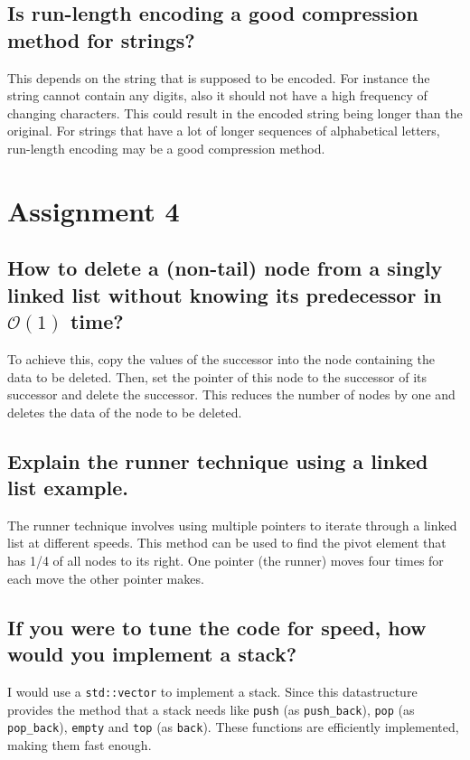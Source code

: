 \documentclass[runningheads]{llncs}
\begin{document}
\subsection*{Is run-length encoding a good compression method for strings?}
This depends on the string that is supposed to be encoded. For instance the string cannot contain any digits,
also it should not have a high frequency of changing characters. This could result in the encoded string
being longer than the original. For strings that have a lot of longer sequences of alphabetical letters,
run-length encoding may be a good compression method.

\section*{Assignment 4}

\subsection*{How to delete a (non-tail) node from a singly linked list without knowing its predecessor in $\mathcal{O}(1)$ time?}
To achieve this, copy the values of the successor into the node containing the data to be deleted. Then, set the
pointer of this node to the successor of its successor and delete the successor. This reduces the number of nodes
by one and deletes the data of the node to be deleted.

\subsection*{Explain the runner technique using a linked list example.}
The runner technique involves using multiple pointers to iterate through a linked list at different speeds.
This method can be used to find the pivot element that has 1/4 of all nodes to its right. One pointer
(the runner) moves four times for each move the other pointer makes.

\subsection*{If you were to tune the code for speed, how would you implement a stack?}
I would use a \verb|std::vector| to implement a stack. Since this datastructure provides the method that a
stack needs like \verb|push| (as \verb|push_back|), \verb|pop| (as \verb|pop_back|), \verb|empty| and
\verb|top| (as \verb|back|). These functions are efficiently implemented, making them fast enough.
\end{document}
